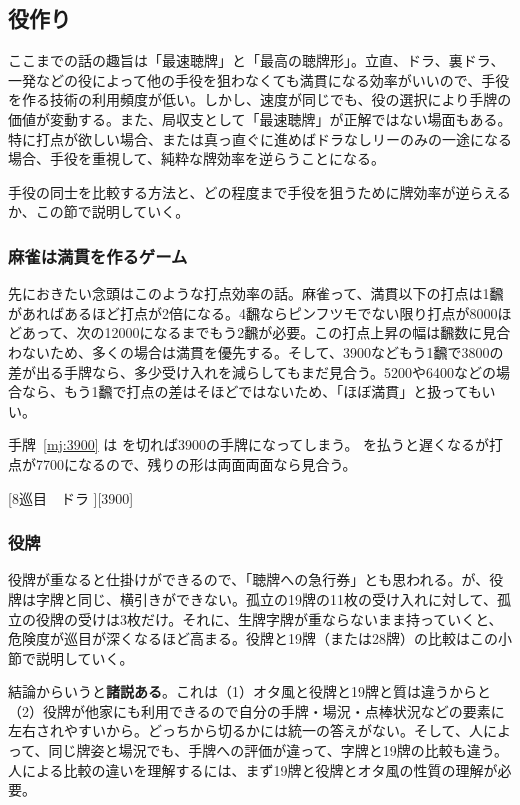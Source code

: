 \documentclass[../nankiru_main.tex]{subfiles}
\begin{document}

\subsection{役作り}

ここまでの話の趣旨は「最速聴牌」と「最高の聴牌形」。立直、ドラ、裏ドラ、一発などの役によって他の手役を狙わなくても満貫になる効率がいいので、手役を作る技術の利用頻度が低い。しかし、速度が同じでも、役の選択により手牌の価値が変動する。また、局収支として「最速聴牌」が正解ではない場面もある。特に打点が欲しい場合、または真っ直ぐに進めばドラなしリーのみの一途になる場合、手役を重視して、純粋な牌効率を逆らうことになる。

手役の同士を比較する方法と、どの程度まで手役を狙うために牌効率が逆らえるか、この節で説明していく。


\subsubsection*{麻雀は満貫を作るゲーム}

先におきたい念頭はこのような打点効率の話。麻雀って、満貫以下の打点は1飜があればあるほど打点が2倍になる。4飜ならピンフツモでない限り打点が8000ほどあって、次の12000になるまでもう2飜が必要。この打点上昇の幅は飜数に見合わないため、多くの場合は満貫を優先する。そして、3900などもう1飜で3800の差が出る手牌なら、多少受け入れを減らしてもまだ見合う。5200や6400などの場合なら、もう1飜で打点の差はそほどではないため、「ほぼ満貫」と扱ってもいい。

手牌~\ref{mj:3900} は  を切れば3900の手牌になってしまう。 を払うと遅くなるが打点が7700になるので、残りの形は両面両面なら見合う\citep[][pp.~98--99]{fkt}。

[8巡目　ドラ ][3900]


\subsubsection{役牌} \label{subsub:yakuhai}

役牌が重なると仕掛けができるので、「聴牌への急行券」とも思われる。が、役牌は字牌と同じ、横引きができない。孤立の19牌の11枚の受け入れに対して、孤立の役牌の受けは3枚だけ。それに、生牌字牌が重ならないまま持っていくと、危険度が巡目が深くなるほど高まる。役牌と19牌（または28牌）の比較はこの小節で説明していく。

結論からいうと\textbf{諸説ある}。これは（1）オタ風と役牌と19牌と質は違うからと（2）役牌が他家にも利用できるので自分の手牌・場況・点棒状況などの要素に左右されやすいから。どっちから切るかには統一の答えがない。そして、人によって、同じ牌姿と場況でも、手牌への評価が違って、字牌と19牌の比較も違う。人による比較の違いを理解するには、まず19牌と役牌とオタ風の性質の理解が必要。
\end{document}
